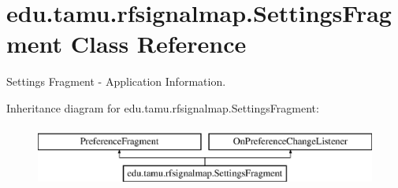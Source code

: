 \hypertarget{classedu_1_1tamu_1_1rfsignalmap_1_1_settings_fragment}{}\section{edu.\+tamu.\+rfsignalmap.\+Settings\+Fragment Class Reference}
\label{classedu_1_1tamu_1_1rfsignalmap_1_1_settings_fragment}


Settings Fragment -\/ Application Information.  


Inheritance diagram for edu.\+tamu.\+rfsignalmap.\+Settings\+Fragment\+:\begin{figure}[H]
\begin{center}
\leavevmode
\includegraphics[height=2.000000cm]{classedu_1_1tamu_1_1rfsignalmap_1_1_settings_fragment}
\end{center}
\end{figure}
